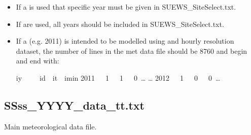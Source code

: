 \documentclass[letterpaper,10pt,english]{sphinxmanual}
\begin{document}
\begin{itemize}
\item {} 
If a  is used that specific year must be given in
SUEWS\_SiteSelect.txt.

\item {} 
If  are used, all years should be included in
SUEWS\_SiteSelect.txt.

\item {} 
If a  (e.g. 2011) is intended to be modelled using and
hourly resolution dataset, the number of lines in the met data file
should be 8760 and begin and end with:

%
\begin{sphinxVerbatim}[commandchars=\\\{\}]
iy     id  it  imin
2011   1   1   0 …
…
2012   1   0   0 …
\end{sphinxVerbatim}

\end{itemize}


\subsection{SSss\_YYYY\_data\_tt.txt}
\label{\detokenize{input_files/met_input:ssss-yyyy-data-tt-txt}}\label{\detokenize{input_files/met_input:id1}}
Main meteorological data file.
\end{document}
